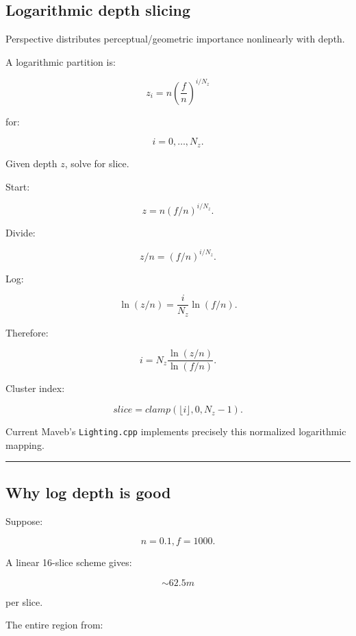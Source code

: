 \subsection{Logarithmic depth slicing}\label{04-visual-computing-ii-ch040-logarithmic-depth-slicing}

\hypertarget{04-visual-computing-ii-ch040-logarithmic-depth-slicing}{}

Perspective distributes perceptual/geometric importance nonlinearly with depth.

A logarithmic partition is:

\[
\boxed{
z_i
=
n
\left(
\frac fn
\right)^{i/N_z}
}
\]

for:

\[
i=0,\dots,N_z.
\]

Given depth \(z\), solve for slice.

Start:

\[
z=
n(f/n)^{i/N_z}.
\]

Divide:

\[
z/n=
(f/n)^{i/N_z}.
\]

Log:

\[
\ln(z/n)
=
\frac i{N_z}
\ln(f/n).
\]

Therefore:

\[
\boxed{
i
=
N_z
\frac{
\ln(z/n)
}{
\ln(f/n)
}.
}
\]

Cluster index:

\[
slice=
clamp(
\lfloor i\rfloor,
0,
N_z-1
).
\]

Current Maveb's \texttt{Lighting.cpp} implements precisely this normalized logarithmic mapping.

\begin{center}\rule{0.5\linewidth}{0.5pt}\end{center}

\subsection{Why log depth is good}\label{04-visual-computing-ii-ch040-why-log-depth-is-good}

\hypertarget{04-visual-computing-ii-ch040-why-log-depth-is-good}{}

Suppose:

\[
n=0.1,
f=1000.
\]

A linear 16-slice scheme gives:

\[
\sim62.5m
\]

per slice.

The entire region from:


